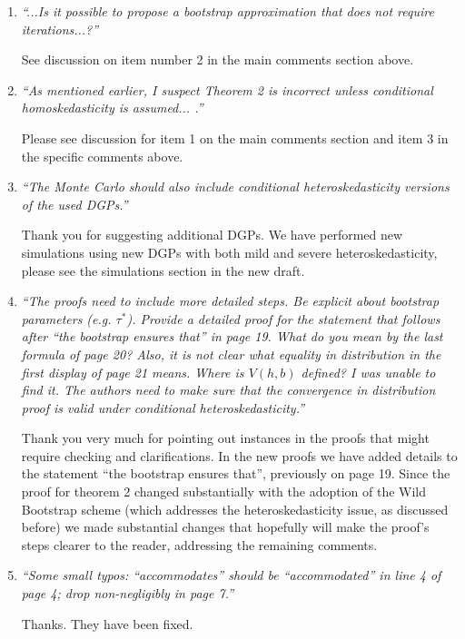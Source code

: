 \documentclass[12pt,fleqn]{article}
\begin{document}
\begin{enumerate}
\item \textit{``...Is it possible to propose a bootstrap approximation that does not require iterations...?''}

See discussion on item number 2 in the main comments section above.

\item \textit{``As mentioned earlier, I suspect Theorem 2 is incorrect unless conditional homoskedasticity is assumed... .''}

  Please see discussion for item 1 on the main comments section and item 3 in the specific comments above.

\item \textit{``The Monte Carlo should also include conditional heteroskedasticity versions of the used DGPs.''}

  Thank you for suggesting additional DGPs. We have performed new simulations using new DGPs with both mild and severe heteroskedasticity, please see the simulations section in the new draft.

\item \textit{``The proofs need to include more detailed steps. Be explicit about bootstrap parameters (e.g. $\tau^{*}$). Provide a detailed proof for the statement that follows after ``the bootstrap ensures that'' in page 19. What do you mean by the last formula of page 20? Also, it is not clear what equality in distribution in the first display of page 21 means. Where is $V(h,b)$ defined? I was unable to find it. The authors need to make sure that the convergence in distribution proof is valid under conditional heteroskedasticity.''}

Thank you very much for pointing out instances in the proofs that might require checking and clarifications.
 In the new proofs we have added details to the statement ``the bootstrap ensures that'', previously on page 19.
 Since the proof for theorem 2 changed substantially with the adoption of the Wild Bootstrap scheme
 (which addresses the heteroskedasticity issue, as discussed before) we made substantial changes that hopefully
 will make the proof's steps clearer to the reader, addressing the remaining comments.

\item \textit{``Some small typos: ``accommodates'' should be ``accommodated'' in line 4 of page 4; drop non-negligibly in page 7.''}
 
Thanks. They have been fixed.

\end{enumerate}
\end{document}
